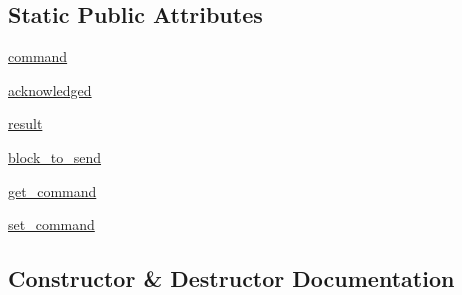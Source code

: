 \subsection*{Static Public Attributes}
\begin{DoxyCompactItemize}
\item 
\hyperlink{classNEAT__PyGenetics_1_1NEAT_1_1Networking_1_1Server_1_1SimulationConnector_1_1SimulationConnector_a2ee895f0adc1c5612da513e76337a2a1}{command}
\item 
\hyperlink{classNEAT__PyGenetics_1_1NEAT_1_1Networking_1_1Server_1_1SimulationConnector_1_1SimulationConnector_a382935d414f40fe1f061eb2599aaee45}{acknowledged}
\item 
\hyperlink{classNEAT__PyGenetics_1_1NEAT_1_1Networking_1_1Server_1_1SimulationConnector_1_1SimulationConnector_a192917886950be80d6b617d89741272e}{result}
\item 
\hyperlink{classNEAT__PyGenetics_1_1NEAT_1_1Networking_1_1Server_1_1SimulationConnector_1_1SimulationConnector_acf2ca405ae294326df8c2ef7b32d7024}{block\+\_\+to\+\_\+send}
\item 
\hyperlink{classNEAT__PyGenetics_1_1NEAT_1_1Networking_1_1Server_1_1SimulationConnector_1_1SimulationConnector_a09ae391da51cbab362309cde45eee5a4}{get\+\_\+command}
\item 
\hyperlink{classNEAT__PyGenetics_1_1NEAT_1_1Networking_1_1Server_1_1SimulationConnector_1_1SimulationConnector_ae984255e91818c23a045b807d373bf1b}{set\+\_\+command}
\end{DoxyCompactItemize}


\subsection{Constructor \& Destructor Documentation}
